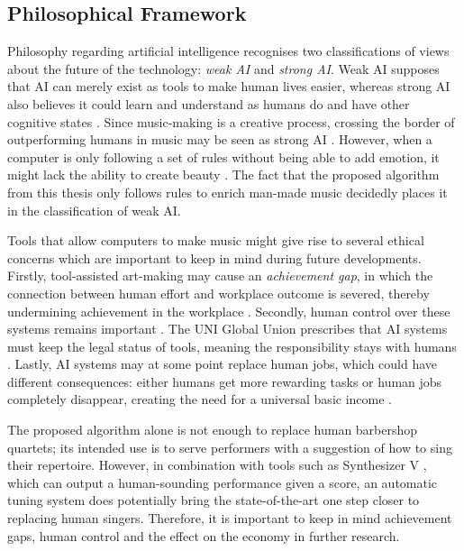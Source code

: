 \documentclass[a4paper]{article}
\begin{document}
\subsection{Philosophical Framework}
\label{philosophy}
Philosophy regarding artificial intelligence recognises two classifications of views about the future of the technology: \textit{weak AI} and \textit{strong AI}. Weak AI supposes that AI can merely exist as tools to make human lives easier, whereas strong AI also believes it could learn and understand as humans do and have other cognitive states \cite{searle_minds_1980}. Since music-making is a creative process, crossing the border of outperforming humans in music may be seen as strong AI \cite{gottschall_rise_2015}. However, when a computer is only following a set of rules without being able to add emotion, it might lack the ability to create beauty \cite{braga_emperor_2017}. The fact that the proposed algorithm from this thesis only follows rules to enrich man-made music decidedly places it in the classification of weak AI.

Tools that allow computers to make music might give rise to several ethical concerns which are important to keep in mind during future developments. Firstly, tool-assisted art-making may cause an \textit{achievement gap}, in which the connection between human effort and workplace outcome is severed, thereby undermining achievement in the workplace \cite{danaher_automation_2021}. Secondly, human control over these systems remains important \cite{fjeld_principled_2020}. The UNI Global Union prescribes that AI systems must keep the legal status of tools, meaning the responsibility stays with humans \cite{uni_global_union_top_2017}. Lastly, AI systems may at some point replace human jobs, which could have different consequences: either humans get more rewarding tasks or human jobs completely disappear, creating the need for a universal basic income \cite{calo_artificial_2017}.

The proposed algorithm alone is not enough to replace human barbershop quartets; its intended use is to serve performers with a suggestion of how to sing their repertoire. However, in combination with tools such as Synthesizer V \cite{hua_synthesizer_2020}, which can output a human-sounding performance given a score, an automatic tuning system does potentially bring the state-of-the-art one step closer to replacing human singers. Therefore, it is important to keep in mind achievement gaps, human control and the effect on the economy in further research.
\end{document}
